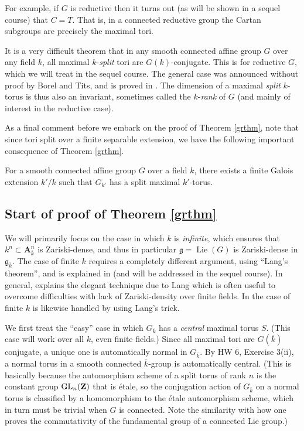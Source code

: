 \documentclass[10pt]{article}
\renewcommand{\(}{\left(}
\renewcommand{\)}{\right)}
\numberwithin{thm}{subsection}
\begin{document}
For example, if $G$ is reductive then it turns out (as will be shown in a sequel course)
that $C=T$.   That is, in a connected
reductive group the Cartan subgroups are precisely the maximal tori.

\begin{remark}
It is a very difficult theorem that in any smooth connected
affine group $G$ over any field $k$, 
all maximal $k$-\textit{split} tori 
are $G(k)$-conjugate.
This is \cite[20.9(ii)]{borel} for reductive $G$, which we will treat in the sequel course.
The general case was announced without proof by Borel and Tits,
and is proved in \cite[Thm.\,C.2.3]{pred}. 
The dimension of a maximal {\em split} $k$-torus is thus also an invariant, sometimes called the 
$k$-\textit{rank} of $G$ (and mainly of interest in the reductive case).  
 \end{remark}

As a final comment before we embark on the proof of Theorem \ref{grthm}, 
note that since tori split over a finite separable extension, we have the following
important consequence of Theorem \ref{grthm}. 

\begin{corollary}
For a smooth connected affine group $G$ over a field $k$, 
there exists a finite Galois extension $k'/k$ such that $G_{k'}$ has a split maximal $k'$-torus.
\end{corollary}


\subsection{Start of proof of Theorem \ref{grthm}}
We will primarily focus on the case in which $k$ is \textit{infinite}, which ensures
that $k^n\subset \mathbf{A}^n_{\overline{k}}$ is Zariski-dense,
and thus in particular $\mathfrak{g}=\operatorname{Lie}(G)$
is Zariski-dense in $\mathfrak{g}_{\overline{k}}$.
The case of finite $k$ requires a completely different argument,
using ``Lang's theorem'', and is explained in \cite[Prop.\,16.6]{borel} (and will be addressed
in the sequel course). In general, \cite[\S16]{borel} explains the elegant technique
due to Lang which is often useful to overcome difficulties with lack of Zariski-density 
over finite fields. In \cite{sga3} the case of finite $k$ is likewise handled by using Lang's trick.

We first treat the ``easy'' case in which $G_{\overline{k}}$ has a \textit{central} maximal torus $S$.
(This case will work over all $k$, even finite fields.) 
Since all maximal tori are $G(\overline{k})$ conjugate, a unique one
is automatically normal in $G_{\overline{k}}$. By HW 6, Exercise 3(ii), a normal torus in a 
smooth connected $\overline{k}$-group is automatically central.
(This is basically because the automorphism scheme of a split torus of
rank $n$ is the constant group ${\rm{GL}}_n({\mathbf{Z}})$ that is \'etale, 
so the conjugation action of $G_{\overline{k}}$
on a normal torus is classified by a homomorphism
to the \'etale automorphism scheme, which in turn must be trivial when $G$ is connected.
Note the similarity with how one proves the commutativity of the fundamental group of
a connected Lie group.)
\end{document}
